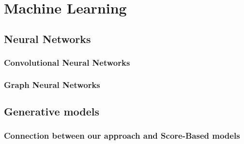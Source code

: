 
\chapter{Machine Learning}
\label{chapter4}

\ifpdf
\graphicspath{{Chapter4/Figs/Raster/}{Chapter4/Figs/PDF/}{Chapter4/Figs/}}
\else
\graphicspath{{Chapter4/Figs/Vector/}{Chapter4/Figs/}}
\fi

\section{Neural Networks}

\subsection{Convolutional Neural Networks}
\label{subsec:nn-cnn}

\subsection{Graph Neural Networks}
\label{subsec:nn-gnn}

\section{Generative models}
\subsection{Connection between our approach and Score-Based models}